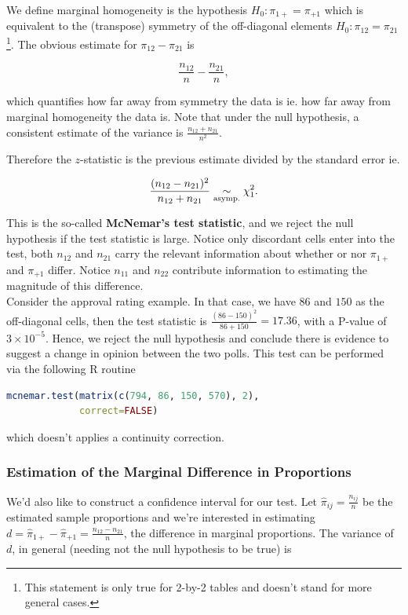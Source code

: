 \documentclass{homework}
\begin{document}
We define marginal homogeneity is the hypothesis $H_0: \pi_{1+}=\pi_{+1}$ which is equivalent to the (transpose) symmetry of the off-diagonal elements $H_0: \pi_{12}=\pi_{21}$\footnote{This statement is only true for 2-by-2 tables and doesn't stand for more general cases.}. The obvious estimate for $\pi_{12}-\pi_{21}$ is 

$$
\frac{n_{12}}{n} - \frac{n_{21}}{n},
$$

which quantifies how far away from symmetry the data is ie. how far away from marginal homogeneity the data is. 
Note that under the null hypothesis, a consistent estimate of the variance is $
\frac{n_{12}+n_{21}}{n^2}.$

Therefore the $z$-statistic is the previous estimate divided by the standard error ie. 

$$
\frac{(n_{12}-n_{21})^2}{n_{12}+n_{21}} \underset{\textnormal{asymp.}}{\sim} \chi^2_{1}.
$$

This is the so-called \textbf{McNemar's test statistic}, and we reject the null hypothesis if the test statistic is large. Notice only discordant cells enter into the test, both $n_{12}$
and $n_{21}$ carry the relevant information about whether or nor $\pi_{1+}$ and $\pi_{+1}$ differ. Notice $n_{11}$ and $n_{22}$ contribute information to estimating the magnitude of this difference. \\

Consider the approval rating example. In that case, we have $86$ and $150$ as the off-diagonal cells, then the test statistic is $\frac{(86-150)^2}{86+150} = 17.36$, with a P-value of $3\times 10^{-5}$. Hence, we reject the null hypothesis and conclude there is evidence to suggest a change in opinion between the two polls. This test can be performed via the following R routine

\begin{lstlisting}[language=R]
mcnemar.test(matrix(c(794, 86, 150, 570), 2),
             correct=FALSE)
\end{lstlisting}

which doesn't applies a continuity correction. \\

\subsubsection{Estimation of the Marginal Difference in Proportions}

We'd also like to construct a confidence interval for our test. Let $\hat{\pi}_{ij} = \frac{n_{ij}}{n}$ be the estimated sample proportions and we're interested in estimating $d = \hat{\pi}_{1+}-\hat{\pi}_{+1}= \frac{n_{12}-n_{21}}{n}$, the difference in marginal proportions. The variance of $d$, in general (needing not the null hypothesis to be true) is 
\end{document}
